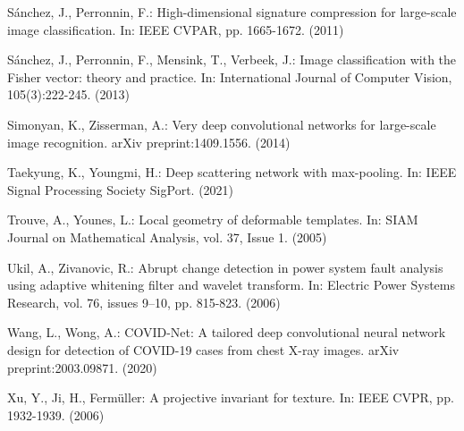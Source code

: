 \documentclass[runningheads]{llncs}
\begin{document}
\begin{thebibliography}{8}
Sánchez, J., Perronnin, F.: High-dimensional signature compression for large-scale image classification. In: IEEE CVPAR, pp. 1665-1672. (2011)

Sánchez, J., Perronnin, F., Mensink, T., Verbeek, J.: Image classification with the Fisher vector: theory and practice. In: International Journal of Computer Vision, 105(3):222-245. (2013)

Simonyan, K., Zisserman, A.: Very deep convolutional networks for large-scale image recognition. arXiv preprint:1409.1556. (2014)

Taekyung, K., Youngmi, H.: Deep scattering network with max-pooling. In: IEEE Signal Processing Society SigPort. (2021)

Trouve, A., Younes, L.: Local geometry of deformable templates. In: SIAM Journal on Mathematical Analysis, vol. 37, Issue 1. (2005)

Ukil, A., Zivanovic, R.: Abrupt change detection in power system fault analysis using adaptive whitening filter and wavelet transform. In: Electric Power Systems Research, vol. 76, issues 9–10, pp. 815-823. (2006)

Wang, L., Wong, A.: COVID-Net: A tailored deep convolutional neural network design for detection of COVID-19 cases from chest X-ray images. arXiv preprint:2003.09871. (2020)

Xu, Y., Ji, H., Fermüller: A projective invariant for texture. In: IEEE CVPR, pp. 1932-1939. (2006)

\end{thebibliography}
\end{document}
